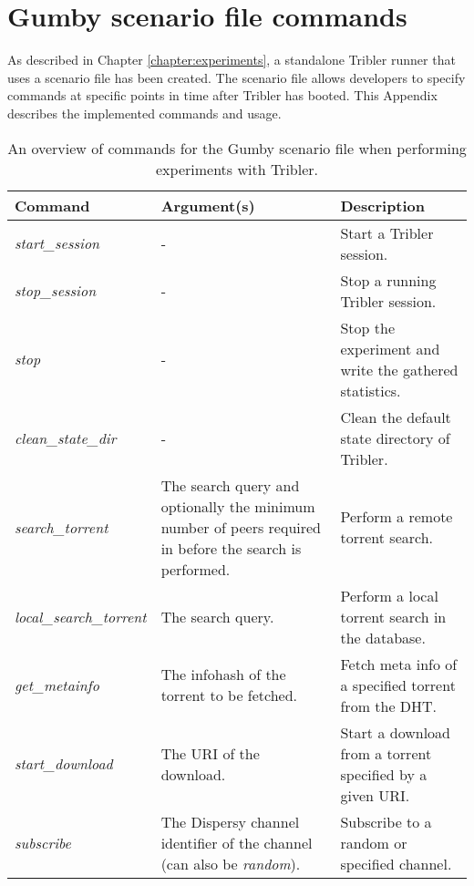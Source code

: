 \chapter{Gumby scenario file commands}
As described in Chapter \ref{chapter:experiments}, a standalone Tribler runner that uses a scenario file has been created. The scenario file allows developers to specify commands at specific points in time after Tribler has booted. This Appendix describes the implemented commands and usage.

\begin{table}[h!]
	\begin{tabularx}{\textwidth}{|X|X|X|}
		\hline
		\textbf{Command} & \textbf{Argument(s)} & \textbf{Description}\\ \hline
		\emph{start\_session} & - & Start a Tribler session.\\ \hline
		\emph{stop\_session} & - & Stop a running Tribler session.\\ \hline
		\emph{stop} & - & Stop the experiment and write the gathered statistics.\\ \hline
		\emph{clean\_state\_dir} & - & Clean the default state directory of Tribler.\\ \hline
		\emph{search\_torrent} & The search query and optionally the minimum number of peers required in before the search is performed. & Perform a remote torrent search.\\ \hline
		\emph{local\_search\_torrent} & The search query. & Perform a local torrent search in the database.\\ \hline
		\emph{get\_metainfo} & The infohash of the torrent to be fetched. & Fetch meta info of a specified torrent from the DHT.\\ \hline
		\emph{start\_download} & The URI of the download. & Start a download from a torrent specified by a given URI.\\ \hline
		\emph{subscribe} & The Dispersy channel identifier of the channel (can also be \emph{random}). & Subscribe to a random or specified channel.\\ \hline
	\end{tabularx}
	\caption{An overview of commands for the Gumby scenario file when performing experiments with Tribler.}
	\label{table:gumby-scenario-file}
\end{table}